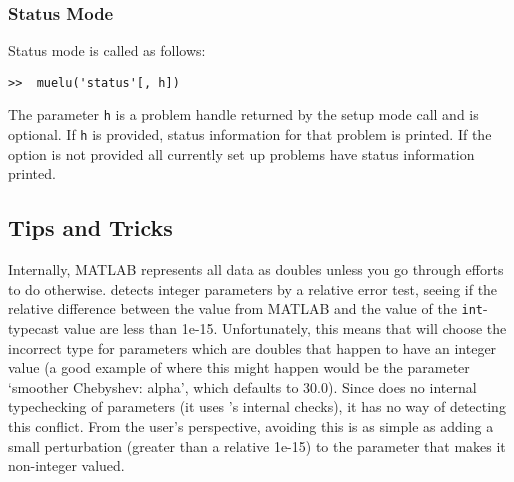 \subsubsection{Status Mode}
Status mode is called as follows:
\begin{verbatim}
>>  muelu('status'[, h])
\end{verbatim}
The parameter \texttt{h} is a problem handle returned by the
setup mode call and is optional.  If \texttt{h} is provided, status
information for that problem is printed.  If the option is not provided all currently
set up problems have status information printed.

\subsection{Tips and Tricks }\label{sec:muemex:tips}

Internally, MATLAB represents all data as doubles unless you go
through efforts to do otherwise.  \muemex detects integer parameters by
a relative error test, seeing if the relative difference between the
value from MATLAB and the value of the \texttt{int}-typecast value are
less than 1e-15.  Unfortunately, this means that \muemex will choose the
incorrect type for parameters which are doubles that happen to have an
integer value (a good example of where this might happen would be the parameter
`smoother Chebyshev: alpha', which defaults to 30.0).  Since \muemex does no
internal typechecking of
parameters (it uses \muelu's internal checks), it has no way of detecting
this conflict.  From the user's perspective, avoiding this is as
simple as adding a small perturbation (greater than a relative 1e-15)
to the parameter that makes it non-integer valued.
